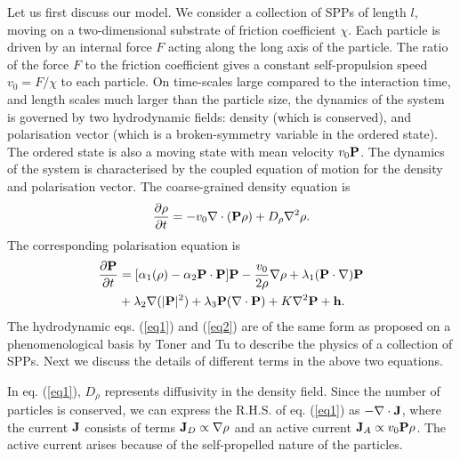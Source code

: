 \documentclass[pre,twocolumn,amssymb,showpacs,superscriptaddress,notitlepage]{revtex4-1}
\begin{document}
Let us first discuss our model. We consider a collection of SPPs of length $l$, moving on a two-dimensional substrate of friction coefficient $\chi$. Each particle is driven by an internal force $F$ acting along the long axis of the particle. The ratio of the force $F$ to the friction coefficient gives a constant  self-propulsion speed $v_0= F/\chi$ to each particle.
On time-scales large compared to the interaction time, and length scales 
much larger than the particle size, the dynamics of the system is governed by two 
hydrodynamic fields: density (which is conserved), 
and polarisation vector (which is a broken-symmetry variable in the ordered state). 
The ordered state is  also a moving state with mean velocity $v_0 {\bf P}$.
The dynamics of the system is characterised by the coupled equation of 
motion for the density and polarisation vector. The coarse-grained density equation is
\begin{equation}
\frac{\partial \rho}{\partial t} = -v_0 \nabla \cdot ({\bf P} \rho) + D_{\rho} \nabla^2 \rho .
\label{eq1}
\end{equation}
The corresponding polarisation equation is
\begin{align}
\frac{\partial {\bf  P}}{\partial t} & =[\alpha_1(\rho) - \alpha_2{\bf  P}\cdot {\bf  P}]{\bf  P} - \frac{v_0}{2 \rho}\nabla \rho  + \lambda_1 ({\bf  P} \cdot \nabla) {\bf  P}
                                    \notag \\
                                    & + \lambda_2 \nabla(|{\bf  P}|^2) + \lambda_3 {\bf  P}(\nabla \cdot {\bf  P}) + K \nabla^2 {\bf  P} + {\bf h}. 
\label{eq2}
\end{align}
The hydrodynamic eqs. (\ref{eq1}) and (\ref{eq2}) are of the same form as proposed on a phenomenological
basis  by Toner and Tu \cite{tonertu} to describe the physics of a collection of SPPs. Next we discuss the details of different terms in the above two equations.

In eq. (\ref{eq1}), $D_{\rho}$ represents diffusivity in the density field. Since the number of particles is conserved, we can express the R.H.S. of eq. (\ref{eq1}) as $-\nabla \cdot {\bf J}$, where the current ${\bf J}$  consists of terms ${\bf J}_D \propto \nabla \rho$ and an active current ${\bf J}_A \propto v_0 {\bf  P}\rho$. The active current arises because of the self-propelled nature of the particles.
\end{document}
